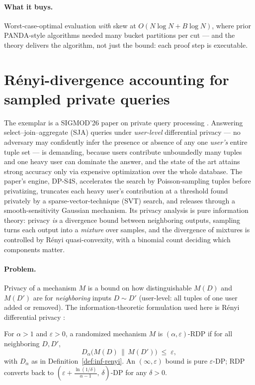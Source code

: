 \paragraph{What it buys.}
Worst-case-optimal evaluation \emph{with} skew at $O(N\log N + B\log N)$, where prior
PANDA-style algorithms needed many bucket partitions per cut --- and the theory
delivers the algorithm, not just the bound: each proof step is executable.

\section{R\'enyi-divergence accounting for sampled private queries}
\label{sec:inf-s4s}

The exemplar is a SIGMOD'26 paper on private query processing \citep{sigmod26-079}.
Answering select--join--aggregate (SJA) queries under \emph{user-level} differential
privacy --- no adversary may confidently infer the presence or absence of any one
\emph{user's} entire tuple set --- is demanding, because users contribute unboundedly
many tuples and one heavy user can dominate the answer, and the state of the art
attains strong accuracy only via expensive optimization over the whole database. The
paper's engine, DP-S4S, accelerates the search by Poisson-sampling tuples before
privatizing, truncates each heavy user's contribution at a threshold found privately
by a sparse-vector-technique (SVT) search, and releases through a smooth-sensitivity
Gaussian mechanism. Its privacy analysis is pure
information theory: privacy \emph{is} a divergence bound between neighboring outputs,
sampling turns each output into a \emph{mixture} over samples, and the divergence of
mixtures is controlled by R\'enyi quasi-convexity, with a binomial count deciding
which components matter.

\paragraph{Problem.}
Privacy of a mechanism $M$ is a bound on how distinguishable $M(D)$ and $M(D')$ are for
\emph{neighboring} inputs $D \sim D'$ (user-level: all tuples of one user added or
removed). The information-theoretic formulation used here is R\'enyi differential
privacy \citep{information-theory-bg5}:

\begin{definition}\label{def:inf-rdp}
For $\alpha > 1$ and $\varepsilon > 0$, a randomized mechanism $M$ is
$(\alpha, \varepsilon)$-RDP if for all neighboring $D, D'$,
\[
D_\alpha\bigl(M(D) \,\big\|\, M(D')\bigr) \;\le\; \varepsilon,
\]
with $D_\alpha$ as in Definition~\ref{def:inf-renyi}. An $(\infty, \varepsilon)$
bound is pure $\varepsilon$-DP; RDP converts back to
$(\varepsilon + \frac{\ln(1/\delta)}{\alpha - 1},\, \delta)$-DP for any $\delta > 0$.
\end{definition}

